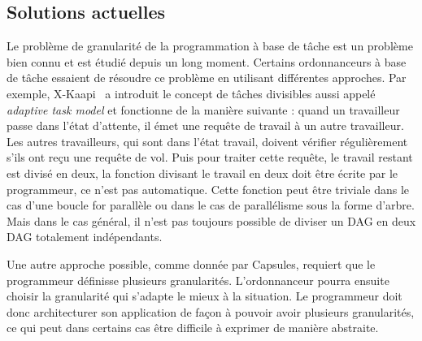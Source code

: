 \subsection{Solutions actuelles}
Le problème de granularité de la programmation à base de tâche est un problème bien connu et est étudié depuis un long moment.
%
Certains ordonnanceurs à base de tâche essaient de résoudre ce problème en utilisant différentes approches.
%
Par exemple, X-Kaapi~\cite{xkaapi} a introduit le concept de tâches divisibles aussi appelé {\em adaptive task model} et fonctionne de la manière suivante :
%
quand un travailleur passe dans l'état d'attente, il émet une requête de travail à un autre travailleur.
%
Les autres travailleurs, qui sont dans l'état travail, doivent vérifier régulièrement s'ils ont reçu une requête de vol.
%
Puis pour traiter cette requête, le travail restant est divisé en deux, la fonction divisant le travail en deux doit être écrite par le programmeur, ce n'est pas automatique.
%
Cette fonction peut être triviale dans le cas d'une boucle for parallèle ou dans le cas de parallélisme sous la forme d'arbre.
%
Mais dans le cas général, il n'est pas toujours possible de diviser un DAG en deux DAG totalement indépendants.


Une autre approche possible, comme donnée par Capsules\cite{capsules}, requiert que le programmeur définisse plusieurs granularités.
%
L'ordonnanceur pourra ensuite choisir la granularité qui s'adapte le mieux à la situation.
%
Le programmeur doit donc architecturer son application de façon à pouvoir avoir plusieurs granularités, ce qui peut dans certains cas être difficile à exprimer de manière abstraite.
